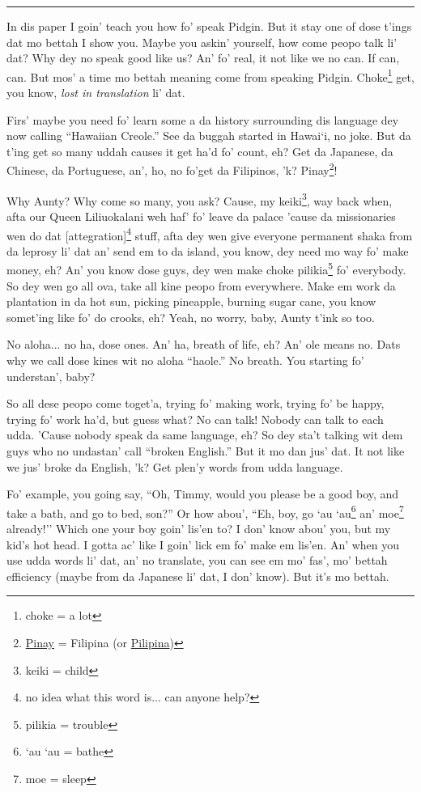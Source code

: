 \documentclass[12pt]{article}%
\begin{document}
\vspace{5mm}
\hrule

\begin{multicols}{2}
In dis paper I goin' teach you how fo' speak Pidgin. But it stay one of dose t'ings dat mo bettah I show you. Maybe you askin' yourself, how come peopo talk li' dat? Why dey no speak good like us? An' fo' real, it not like we no can. If can, can. But mos' a time mo bettah meaning come from speaking Pidgin. Choke\footnote{choke = a lot} get, you know, {\em lost in translation} li' dat.

Firs' maybe you need fo' learn some a da history surrounding dis language dey now calling ``Hawaiian Creole.'' See da buggah started in Hawai`i, no joke. But da t'ing get so many uddah causes it get ha'd fo' count, eh? Get da Japanese, da Chinese, da Portuguese, an', ho, no fo'get da Filipinos, 'k? Pinay\footnote{\href{http://en.wikipedia.org/wiki/Pinoy}{Pinay} = Filipina (or \href{http://globalnation.inquirer.net/80871/why-filipino-americans-say-pilipino-not-filipino/}{Pilipina})}!

Why Aunty? Why come so many, you ask? Cause, my keiki\footnote{keiki = child}, way back when, afta our Queen Liliuokalani weh haf' fo' leave da palace 'cause da missionaries wen do dat [attegration]\footnote{no idea what this word is... can anyone help?} stuff, afta dey wen give everyone permanent shaka from da leprosy li' dat an' send em to da island, you know, dey need mo way fo' make money, eh? An' you know dose guys, dey wen make choke pilikia\footnote{pilikia = trouble} fo' everybody. So dey wen go all ova, take all kine peopo from everywhere. Make em work da plantation in da hot sun, picking pineapple, burning sugar cane, you know somet'ing like fo' do crooks, eh? Yeah, no worry, baby, Aunty t'ink so too. 

No aloha... no ha, dose ones. An' ha, breath of life, eh? An' ole means no. Dats why we call dose kines wit no aloha ``haole.'' No breath. You starting fo' understan', baby?

So all dese peopo come toget'a, trying fo' making work, trying fo' be happy, trying fo' work ha'd, but guess what? No can talk! Nobody can talk to each udda. 'Cause nobody speak da same language, eh? So dey sta't talking wit dem guys who no undastan' call ``broken English.'' But it mo dan jus' dat. It not like we jus' broke da English, 'k? Get plen'y words from udda language. 

Fo' example, you going say, ``Oh, Timmy, would you please be a good boy, and take a bath, and go to bed, son?'' Or how abou', ``Eh, boy, go `au `au\footnote{`au `au = bathe} an' moe\footnote{moe = sleep} already!'' Which one your boy goin' lis'en to? I don' know abou' you, but my kid's hot head. I gotta ac' like I goin' lick em fo' make em lis'en. An' when you use udda words li' dat, an' no translate, you can see em mo' fas', mo' bettah efficiency (maybe from da Japanese li' dat, I don' know). But it's mo bettah.


\end{multicols}
\end{document}
